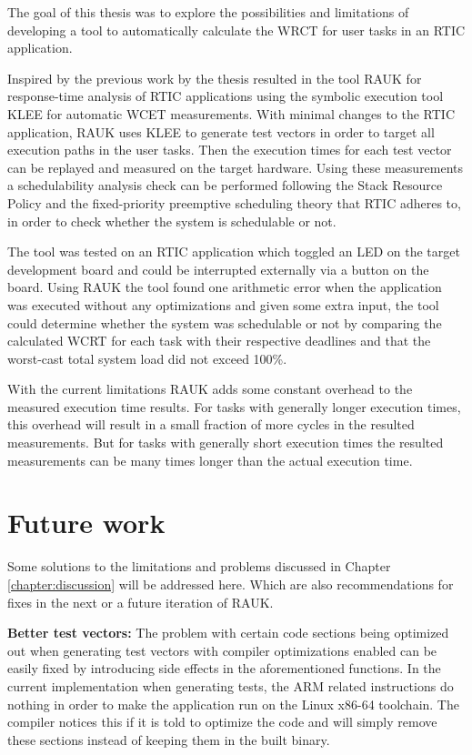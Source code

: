 The goal of this thesis was to explore the possibilities and limitations of
developing a tool to automatically calculate the WRCT for user tasks in an
RTIC application.

Inspired by the previous work by \cite{lindner} the thesis resulted in the tool
RAUK for response-time analysis of RTIC applications using the symbolic
execution tool KLEE for automatic WCET measurements. With minimal changes to
the RTIC application, RAUK uses KLEE to generate test vectors in order to
target all execution paths in the user tasks. Then the execution times for each
test vector can be replayed and measured on the target hardware. Using these
measurements a schedulability analysis check can be performed following the Stack
Resource Policy and the fixed-priority preemptive scheduling theory that RTIC
adheres to, in order to check whether the system is schedulable or not.

The tool was tested on an RTIC application which toggled an LED on the
target development board and could be interrupted externally via a button
on the board. Using RAUK the tool found one arithmetic error when the
application was executed without any optimizations and given some extra input,
the tool could determine whether the system was schedulable or not by comparing
the calculated WCRT for each task with their respective deadlines and that the
worst-cast total system load did not exceed 100\%.

With the current limitations RAUK adds some constant overhead to the measured
execution time results. For tasks with generally longer execution times, this
overhead will result in a small fraction of more cycles in the resulted
measurements. But for tasks with generally short execution times the resulted
measurements can be many times longer than the actual execution time.

\section{Future work}
Some solutions to the limitations and problems discussed in Chapter
\ref{chapter:discussion} will be addressed here. Which are also recommendations
for fixes in the next or a future iteration of RAUK.

\textbf{Better test vectors:} The problem with certain code sections being
optimized out when generating test vectors with compiler optimizations enabled
can be easily fixed by introducing side effects in the aforementioned
functions. In the current implementation when generating tests, the ARM related
instructions do nothing in order to make the application run on the Linux
x86-64 toolchain. The compiler notices this if it is told to optimize the code
and will simply remove these sections instead of keeping them in the built
binary.

